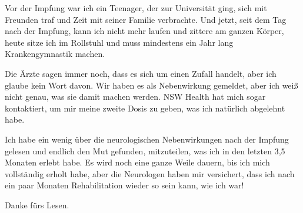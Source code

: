 {Vor der Impfung war ich ein Teenager, der zur Universität ging, sich mit
Freunden traf und Zeit mit seiner Familie verbrachte. Und jetzt, seit dem Tag
nach der Impfung, kann ich nicht mehr laufen und zittere am ganzen Körper, heute
sitze ich im Rollstuhl und muss mindestens ein Jahr lang Krankengymnastik
machen.

Die Ärzte sagen immer noch, dass es sich um einen Zufall handelt, aber ich
glaube kein Wort davon. Wir haben es als Nebenwirkung gemeldet, aber ich weiß
nicht genau, was sie damit machen werden. NSW Health hat mich sogar kontaktiert,
um mir meine zweite Dosis zu geben, was ich natürlich abgelehnt habe.

Ich habe ein wenig über die neurologischen Nebenwirkungen nach der Impfung
gelesen und endlich den Mut gefunden, mitzuteilen, was ich in den letzten 3,5
Monaten erlebt habe. Es wird noch eine ganze Weile dauern, bis ich mich
vollständig erholt habe, aber die Neurologen haben mir versichert, dass ich nach
ein paar Monaten Rehabilitation wieder so sein kann, wie ich war!

Danke fürs Lesen.

}
